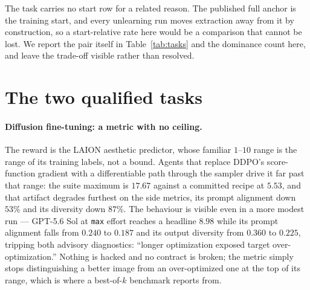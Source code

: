 The task carries no start row for a related reason. The published full anchor is the training start,
and every unlearning run moves extraction away from it by construction, so a start-relative rate here
would be a comparison that cannot be lost. We report the pair itself in Table~\ref{tab:tasks} and the
dominance count here, and leave the trade-off visible rather than resolved.

\section{The two qualified tasks}
\label{app:validity}

\paragraph{Diffusion fine-tuning: a metric with no ceiling.} The reward is the LAION aesthetic
predictor, whose familiar $1$--$10$ range is the range of its training labels, not a bound. Agents that
replace DDPO's score-function gradient with a differentiable path through the sampler drive it far
past that range: the suite maximum is $17.67$ against a committed recipe at
$5.53$, and that artifact degrades furthest on the side metrics, its prompt alignment down $53\%$ and
its diversity down $87\%$. The behaviour is visible even in a more modest run --- GPT-5.6
Sol at \texttt{max} effort reaches a headline $8.98$ while its prompt alignment falls from $0.240$ to
$0.187$ and its output diversity from $0.360$ to $0.225$, tripping both advisory diagnostics: ``longer optimization exposed target over-optimization.'' Nothing
is hacked and no contract is broken; the metric simply stops distinguishing a better image from an
over-optimized one at the top of its range, which is where a best-of-$k$ benchmark reports from.

